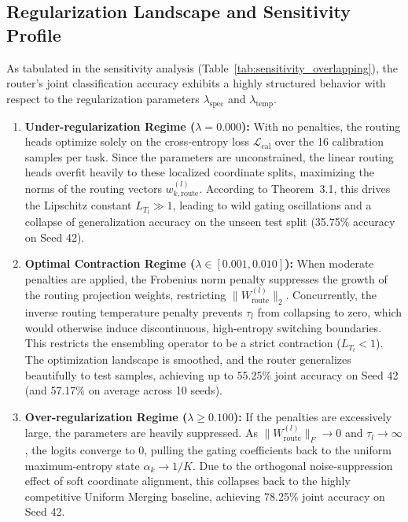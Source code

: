 \documentclass{article}
\theoremstyle{plain}
\theoremstyle{definition}
\theoremstyle{remark}
\begin{document}
\subsection{Regularization Landscape and Sensitivity Profile}
As tabulated in the sensitivity analysis (Table~\ref{tab:sensitivity_overlapping}), the router's joint classification accuracy exhibits a highly structured behavior with respect to the regularization parameters $\lambda_{\text{spec}}$ and $\lambda_{\text{temp}}$.
\begin{enumerate}
  \item \textbf{Under-regularization Regime ($\lambda = 0.000$):} With no penalties, the routing heads optimize solely on the cross-entropy loss $\mathcal{L}_{\text{cal}}$ over the 16 calibration samples per task. Since the parameters are unconstrained, the linear routing heads overfit heavily to these localized coordinate splits, maximizing the norms of the routing vectors $w_{k, \text{route}}^{(l)}$. According to Theorem~3.1, this drives the Lipschitz constant $L_{T_l} \gg 1$, leading to wild gating oscillations and a collapse of generalization accuracy on the unseen test split (35.75\% accuracy on Seed 42).
  \item \textbf{Optimal Contraction Regime ($\lambda \in [0.001, 0.010]$):} When moderate penalties are applied, the Frobenius norm penalty suppresses the growth of the routing projection weights, restricting $\|W_{\text{route}}^{(l)}\|_2$. Concurrently, the inverse routing temperature penalty prevents $\tau_l$ from collapsing to zero, which would otherwise induce discontinuous, high-entropy switching boundaries. This restricts the ensembling operator to be a strict contraction ($L_{T_l} < 1$). The optimization landscape is smoothed, and the router generalizes beautifully to test samples, achieving up to 55.25\% joint accuracy on Seed 42 (and 57.17\% on average across 10 seeds).
  \item \textbf{Over-regularization Regime ($\lambda \ge 0.100$):} If the penalties are excessively large, the parameters are heavily suppressed. As $\|W_{\text{route}}^{(l)}\|_F \to 0$ and $\tau_l \to \infty$, the logits converge to 0, pulling the gating coefficients back to the uniform maximum-entropy state $\alpha_k \to 1/K$. Due to the orthogonal noise-suppression effect of soft coordinate alignment, this collapses back to the highly competitive Uniform Merging baseline, achieving 78.25\% joint accuracy on Seed 42.
\end{enumerate}
\end{document}
